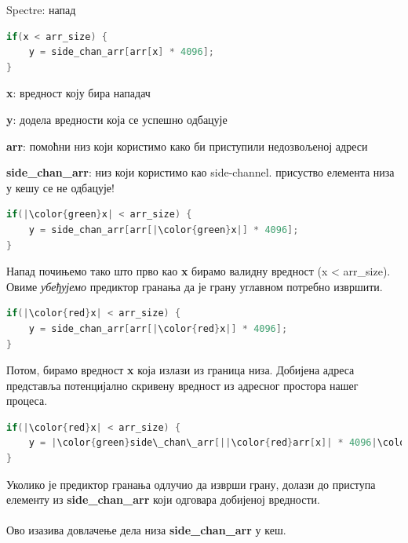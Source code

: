 \documentclass[xcolor=table]{beamer}
\begin{document}
    \begin{frame}{Spectre: напад}
    
    
        \begin{lstlisting}[language=java,frame=single]
if(x < arr_size) {
    y = side_chan_arr[arr[x] * 4096];
}
        \end{lstlisting}
        
        \textbf{x}: вредност коју бира нападач
        
        \textbf{y}: додела вредности која се успешно одбацује
        
        \textbf{arr}: помоћни низ који користимо како би приступили недозвољеној адреси
        
        \textbf{side\_chan\_arr}: низ који користимо као side-channel. присуство елемента низа у кешу се не одбацује!
        
        \framebreak
        \begin{lstlisting}[language=java,frame=single]
if(|\color{green}x| < arr_size) {
    y = side_chan_arr[arr[|\color{green}x|] * 4096];
}
        \end{lstlisting}
        
        Напад почињемо тако што прво као \textbf{x} бирамо валидну вредност (x < arr\_size).
        Овиме \textit{убеђујемо} предиктор гранања да је грану углавном потребно извршити.
        
        \framebreak
        \begin{lstlisting}[language=java,frame=single]
if(|\color{red}x| < arr_size) {
    y = side_chan_arr[arr[|\color{red}x|] * 4096];
}
        \end{lstlisting}
        
        Потом, бирамо вредност \textbf{x} која излази из граница низа.
        Добијена адреса представља потенцијално скривену вредност из адресног простора нашег процеса.
        
        \framebreak
        \begin{lstlisting}[language=java,frame=single]
if(|\color{red}x| < arr_size) {
    y = |\color{green}side\_chan\_arr[||\color{red}arr[x]| * 4096|\color{green}]|;
}
        \end{lstlisting}
        
        Уколико је предиктор гранања одлучио да изврши грану, долази до приступа елементу из \textbf{side\_chan\_arr} који одговара добијеној вредности.
        \\~\\
        Ово изазива довлачење дела низа \textbf{side\_chan\_arr} у кеш.
        

\end{frame}
\end{document}
